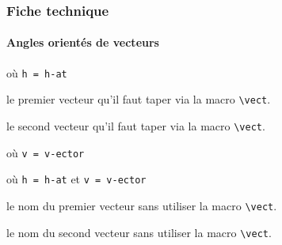 \documentclass[12pt,a4paper]{article}
\makeatletter
\newcommand\@no@point[1]{%
		\IfStrEq{#1}{i}{%
			\imath%
		}{%
			\IfStrEq{#1}{j}{%
				\jmath%
			}{%
				#1
			}%
		}%
	}
\newcommand\vect{\@ifstar{\@vect@star}{\@vect@no@star}}
\newcommand*\@vect@star[1]{\vv*{\@no@point{#1}}}
\newcommand*\@vect@no@star[1]{\vv{\@no@point{#1}}}
\makeatother
\begin{document}


\subsubsection{Fiche technique}

\paragraph{Angles orientés de vecteurs}


  où \quad \verb+h = h-at+

 le premier vecteur qu'il faut taper via la macro \verb+\vect+.

 le second vecteur qu'il faut taper via la macro \verb+\vect+.


\separation


 où \quad \verb+v = v-ector+

 où \quad \verb+h = h-at+ et \verb+v = v-ector+

 le nom du premier vecteur sans utiliser la macro \verb+\vect+.

 le nom du second vecteur sans utiliser la macro \verb+\vect+.
\end{document}
